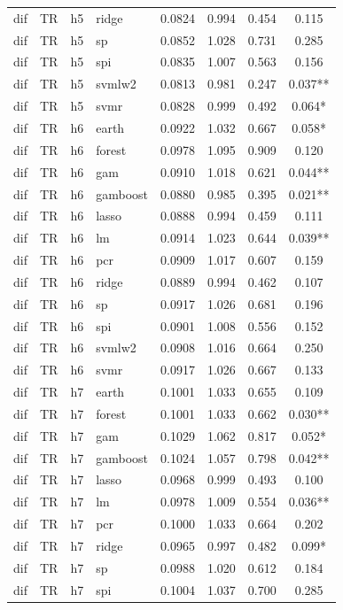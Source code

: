 \begin{ThreePartTable}
\begin{longtable}[t]{llclcccc}
dif & TR & h5 & ridge & 0.0824 & 0.994 & 0.454 & 0.115\\
dif & TR & h5 & sp & 0.0852 & 1.028 & 0.731 & 0.285\\
dif & TR & h5 & spi & 0.0835 & 1.007 & 0.563 & 0.156\\
dif & TR & h5 & svmlw2 & 0.0813 & 0.981 & 0.247 & 0.037**\\
dif & TR & h5 & svmr & 0.0828 & 0.999 & 0.492 & 0.064*\\
\addlinespace
dif & TR & h6 & earth & 0.0922 & 1.032 & 0.667 & 0.058*\\
dif & TR & h6 & forest & 0.0978 & 1.095 & 0.909 & 0.120\\
dif & TR & h6 & gam & 0.0910 & 1.018 & 0.621 & 0.044**\\
dif & TR & h6 & gamboost & 0.0880 & 0.985 & 0.395 & 0.021**\\
dif & TR & h6 & lasso & 0.0888 & 0.994 & 0.459 & 0.111\\
dif & TR & h6 & lm & 0.0914 & 1.023 & 0.644 & 0.039**\\
dif & TR & h6 & pcr & 0.0909 & 1.017 & 0.607 & 0.159\\
dif & TR & h6 & ridge & 0.0889 & 0.994 & 0.462 & 0.107\\
dif & TR & h6 & sp & 0.0917 & 1.026 & 0.681 & 0.196\\
dif & TR & h6 & spi & 0.0901 & 1.008 & 0.556 & 0.152\\
dif & TR & h6 & svmlw2 & 0.0908 & 1.016 & 0.664 & 0.250\\
dif & TR & h6 & svmr & 0.0917 & 1.026 & 0.667 & 0.133\\
\addlinespace
dif & TR & h7 & earth & 0.1001 & 1.033 & 0.655 & 0.109\\
dif & TR & h7 & forest & 0.1001 & 1.033 & 0.662 & 0.030**\\
dif & TR & h7 & gam & 0.1029 & 1.062 & 0.817 & 0.052*\\
dif & TR & h7 & gamboost & 0.1024 & 1.057 & 0.798 & 0.042**\\
dif & TR & h7 & lasso & 0.0968 & 0.999 & 0.493 & 0.100\\
dif & TR & h7 & lm & 0.0978 & 1.009 & 0.554 & 0.036**\\
dif & TR & h7 & pcr & 0.1000 & 1.033 & 0.664 & 0.202\\
dif & TR & h7 & ridge & 0.0965 & 0.997 & 0.482 & 0.099*\\
dif & TR & h7 & sp & 0.0988 & 1.020 & 0.612 & 0.184\\
dif & TR & h7 & spi & 0.1004 & 1.037 & 0.700 & 0.285\\

\end{longtable}
\end{ThreePartTable}
